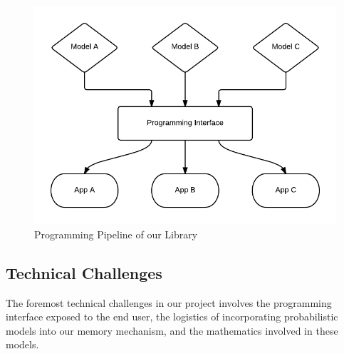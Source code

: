 \documentclass{sig-alternate}
\begin{document}
\begin{figure}[H]
	\begin{center}
		\includegraphics[width=1\linewidth]{block2}
	\end{center}
	\vspace{-12pt}
	\caption{Programming Pipeline of our Library}
	\label{fig:block2}
\end{figure}

%

\subsection{Technical Challenges}
\label{subsec:tech_challenges}
The foremost technical challenges in our project involves
the programming interface exposed to the end user,
the logistics of incorporating probabilistic models into our memory mechanism, and
the mathematics involved in these models.
\end{document}
